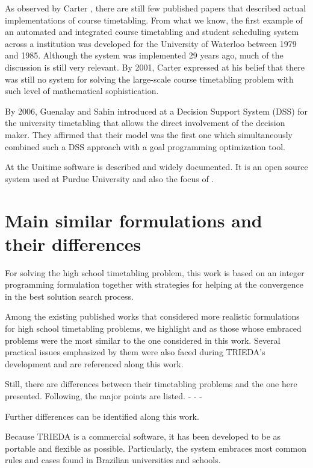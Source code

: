 As observed by Carter \cite{Carter2001}, there are still few published papers that described actual implementations of course timetabling. From what we know, the first example of an automated and integrated course timetabling and student scheduling system across a institution was developed for the University of Waterloo between 1979 and 1985. Although the system was implemented 29 years ago, much of the discussion is still very relevant. By 2001, Carter expressed at \cite{Carter2001} his belief that there was still no system for solving the large-scale course timetabling problem with such level of mathematical sophistication.

By 2006, Guenalay and Sahin introduced at \cite{Guenalay2006} a Decision Support System (DSS) for the university timetabling that allows the direct involvement of the decision maker. They affirmed that their model was the first one which simultaneously combined such a DSS approach with a goal programming optimization tool.

At \cite{Unitime} the Unitime software is described and widely documented. It is an open source system used at Purdue University and also the focus of \cite{Murray2007}.


\section{Main similar formulations and their differences}

For solving the high school timetabling problem, this work is based on an integer programming formulation together with strategies for helping at the convergence in the best solution search process.

Among the existing published works that considered more realistic formulations for high school timetabling problems, we highlight \cite{Birbas2009} and \cite{Birbas2009} as those whose embraced problems were the most similar to the one considered in this work. Several practical issues emphasized by them were also faced during TRIEDA's development and are referenced along this work.

Still, there are differences between their timetabling problems and the one here presented. Following, the major points are listed.
-
-
-

Further differences can be identified along this work.

Because TRIEDA is a commercial software, it has been developed to be as portable and flexible as possible. Particularly, the system embraces most common rules and cases found in Brazilian universities and schools.


